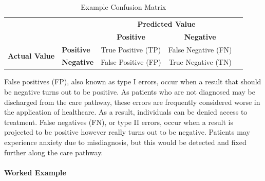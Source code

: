 \documentclass[../thesis.tex]{subfiles}
\begin{document}
\begin{table}[]
    \centering
    \begin{tabular}{clccc} \toprule
    && \multicolumn{2}{c}{\textbf{Predicted Value} }\\
         && \textbf{Positive} & \textbf{Negative}  \\ \midrule
      \multirow{2}{*}{\textbf{Actual Value}} &\textbf{Positive}   & True Positive (TP) & False Negative (FN)   \\
      &\textbf{Negative}  & False Positive (FP) & True Negative (TN)\\ \bottomrule
    \end{tabular}
\caption{Example Confusion Matrix}
\label{tab:ConfusionMatrix}
\end{table}

False positives (FP), also known as type I errors, occur when a result that should be negative turns out to be positive. As patients who are not diagnosed may be discharged from the care pathway, these errors are frequently considered worse in the application of healthcare. As a result, individuals can be denied access to treatment. False negatives (FN), or type II  errors, occur when a result is projected to be positive however really turns out to be negative. Patients may experience anxiety due to misdiagnosis, but this would be detected and fixed further along the care pathway.

\paragraph{Worked Example}
\end{document}
